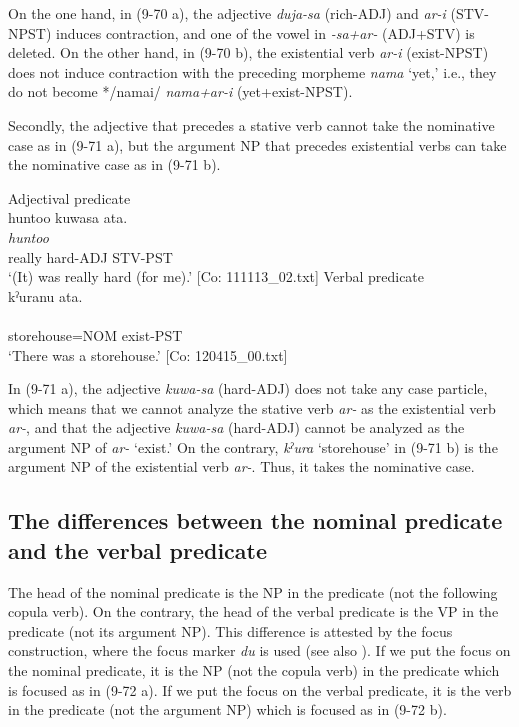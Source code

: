 On the one hand, in (9-70 a), the adjective \textit{duja-sa} (rich-ADJ) and \textit{ar-i} (STV-NPST) induces contraction, and one of the vowel in \textit{{}-sa+ar-} (ADJ+STV) is deleted. On the other hand, in (9-70 b), the existential verb \textit{ar-i} (exist-NPST) does not induce contraction with the preceding morpheme \textit{nama} ‘yet,’ i.e., they do not become */namai/ \textit{nama+ar-i} (yet+exist-NPST).

Secondly, the adjective that precedes a stative verb cannot take the nominative case as in (9-71 a), but the argument NP that precedes existential verbs can take the nominative case as in (9-71 b).

\ea    \label{ex:9.71}
 \ea Adjectival predicate\\
    \glll  huntoo  kuwasa  ata.\\
      \textit{huntoo}  \textit{}  \textit{}\\
      really  hard-ADJ  STV-PST\\
      \glt       ‘(It) was really hard (for me).’ [Co: 111113\_02.txt]
 \ex Verbal predicate\\
    \glll  kˀuranu  ata.\\
      \textit{}  \textit{}\\
      storehouse=NOM  exist-PST\\
      \glt       ‘There was a storehouse.’ [Co: 120415\_00.txt]
    \z
\z

In (9-71 a), the adjective \textit{kuwa-sa} (hard-ADJ) does not take any case particle, which means that we cannot analyze the stative verb \textit{ar-} as the existential verb \textit{ar-}, and that the adjective \textit{kuwa-sa} (hard-ADJ) cannot be analyzed as the argument NP of \textit{ar-} ‘exist.’ On the contrary, \textit{kˀura} ‘storehouse’ in (9-71 b) is the argument NP of the existential verb \textit{ar-}. Thus, it takes the nominative case.

\subsection{The differences between the nominal predicate and the verbal predicate}\label{sec:9.4.3}

The head of the nominal predicate is the NP in the predicate (not the following copula verb). On the contrary, the head of the verbal predicate is the VP in the predicate (not its argument NP). This difference is attested by the focus construction, where the focus marker \textit{du} is used (see also ). If we put the focus on the nominal predicate, it is the NP (not the copula verb) in the predicate which is focused as in (9-72 a). If we put the focus on the verbal predicate, it is the verb in the predicate (not the argument NP) which is focused as in (9-72 b).

